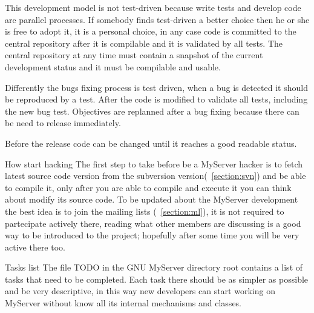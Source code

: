 \documentclass[12pt]{article}
\begin{document}
This development model is not test-driven because write tests and
develop code are parallel processes.
If somebody finds test-driven a better choice then he or she is free
to adopt it, it is a personal choice, in any case code is committed
to the central repository after it is compilable and it is validated
by all tests.
The central repository at any time must contain a snapshot of the
current development status and it must be compilable and usable.

Differently the bugs fixing process is test driven, when a bug is
detected it should be reproduced by a test.  After the code is
modified to validate all tests, including the new bug test.
Objectives are replanned after a bug fixing because there can be need
to release immediately.

Before the release code can be changed until it reaches a good
readable status.

\begin{section}{How start hacking}
The first step to take before be a MyServer hacker is to fetch latest
source code version from the subversion version(~\ref{section:svn})
and be able to compile it, only after you are able to compile and
execute it you can think about modify its source code.
To be updated about the MyServer development the best idea is to join
the mailing lists (~\ref{section:ml}), it is not required to
partecipate actively there, reading what other members are discussing
is a good way to be introduced to the project; hopefully after some
time you will be very active there too.
\end{section}

\begin{section}{Tasks list}
The file TODO in the GNU MyServer directory root contains a list of
tasks that need to be completed.  Each task there should be as simpler
as possible and be very descriptive, in this way new developers can
start working on MyServer without know all its internal mechanisms and
classes.
\end{section}
\end{document}
